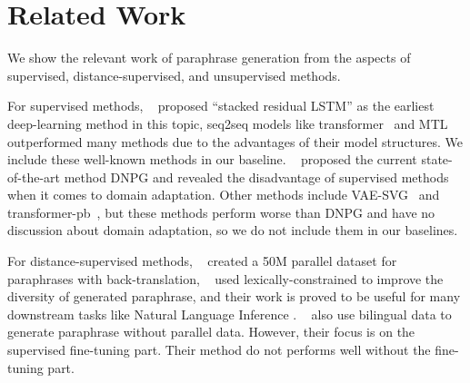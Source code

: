\section{Related Work}
We show the relevant work of paraphrase generation from the aspects of supervised, distance-supervised, and unsupervised methods.

For supervised methods, \citeauthor{prakash2016neural}~ proposed ``stacked residual LSTM'' as the earliest deep-learning method in this topic, seq2seq models like transformer~\cite{vaswani2017attention} and MTL~\cite{domhan2017using} outperformed many methods due to the advantages of their model structures. We include these well-known methods in our baseline.  \citeauthor{li2019decomposable}~ proposed the current state-of-the-art method DNPG and revealed the disadvantage of supervised methods when it comes to domain adaptation.  Other methods include VAE-SVG~\cite{gupta2018deep} and transformer-pb~\cite{wang2019task}, but these methods perform worse than DNPG and have no discussion about domain adaptation, so we do not include them in our baselines.

For distance-supervised methods, \citeauthor{wieting2017paranmt}~ created a 50M parallel dataset for paraphrases with back-translation, \citeauthor{hu2019parabank}~ used lexically-constrained to improve the diversity of generated paraphrase, and their work is proved to be useful for many downstream tasks like Natural Language Inference \cite{hu2019improved}. \citeauthor{liu2020exploring}~ also use bilingual data to generate paraphrase without parallel data. However, their focus is on the supervised fine-tuning part. Their method do not performs well without the fine-tuning part.

